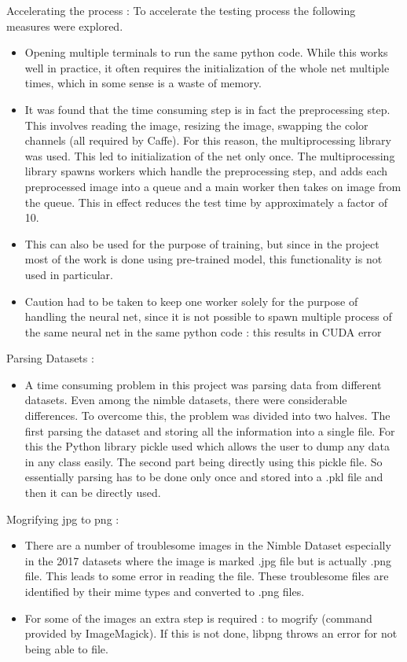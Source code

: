 \documentclass{article}
\begin{document}
Accelerating the process : To accelerate the testing process the following measures were explored.
\begin{itemize}
\item Opening multiple terminals to run the same python code. While this works well in practice, it often requires the initialization of the whole net multiple times, which in some sense is a waste of memory.
\item It was found that the time consuming step is in fact the preprocessing step. This involves reading the image, resizing the image, swapping the color channels (all required by Caffe). For this reason, the multiprocessing library was used. This led to initialization of the net only once. The multiprocessing library spawns workers which handle the preprocessing step, and adds each preprocessed image into a queue and a main worker then takes on image from the queue. This in effect reduces the test time by approximately a factor of 10.
\item This can also be used for the purpose of training, but since in the project most of the work is done using pre-trained model, this functionality is not used in particular.
\item Caution had to be taken to keep one worker solely for the purpose of handling the neural net, since it is not possible to spawn multiple process of the same neural net in the same python code : this results in CUDA error %
\end{itemize}

Parsing Datasets :
\begin{itemize}
\item A time consuming problem in this project was parsing data from different datasets. Even among the nimble datasets, there were considerable differences. To overcome this, the problem was divided into two halves. The first parsing the dataset and storing all the information into a single file. For this the Python library pickle used which allows the user to dump any data in any class easily. The second part being directly using this pickle file. So essentially parsing has to be done only once and stored into a .pkl file and then it can be directly used.
\end{itemize}

Mogrifying jpg to png :
\begin{itemize}
\item There are a number of troublesome images in the Nimble Dataset especially in the 2017 datasets where the image is marked .jpg file but is actually .png file. This leads to some error in reading the file. These troublesome files are identified by their mime types and converted to .png files.
\item For some of the images an extra step is required : to mogrify (command provided by ImageMagick). If this is not done, libpng throws an error for not being able to file.
\end{itemize}
\end{document}
